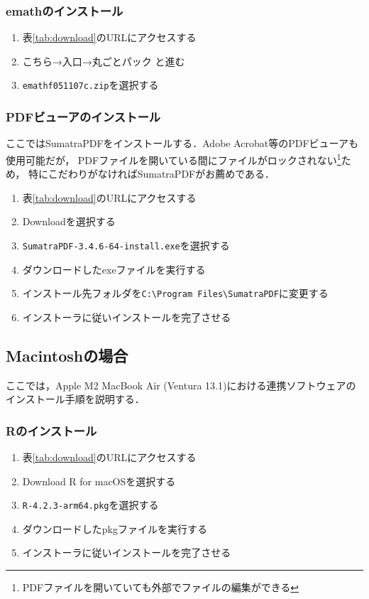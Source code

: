 \subsubsection{emathのインストール}
\begin{enumerate}
    \item 表\ref{tab:download}のURLにアクセスする
    \item こちら→入口→丸ごとパック と進む
    \item \verb|emathf051107c.zip|を選択する
\end{enumerate}

\subsubsection{PDFビューアのインストール}
ここではSumatraPDFをインストールする．Adobe Acrobat等のPDFビューアも使用可能だが，
PDFファイルを開いている間にファイルがロックされない\footnote{PDFファイルを開いていても外部でファイルの編集ができる}ため，
特にこだわりがなければSumatraPDFがお薦めである．
\begin{enumerate}
    \item 表\ref{tab:download}のURLにアクセスする
    \item Downloadを選択する
    \item \verb|SumatraPDF-3.4.6-64-install.exe|を選択する
    \item ダウンロードしたexeファイルを実行する
    \item インストール先フォルダを\verb|C:\Program Files\SumatraPDF|に変更する
    \item インストーラに従いインストールを完了させる
\end{enumerate}

\newpage

\subsection{Macintoshの場合}

ここでは，Apple M2 MacBook Air (Ventura 13.1)における連携ソフトウェアのインストール手順を説明する．

\subsubsection{Rのインストール}
\begin{enumerate}
    \item 表\ref{tab:download}のURLにアクセスする
    \item Download R for macOSを選択する
    \item \verb|R-4.2.3-arm64.pkg|を選択する
    \item ダウンロードしたpkgファイルを実行する
    \item インストーラに従いインストールを完了させる
\end{enumerate}

